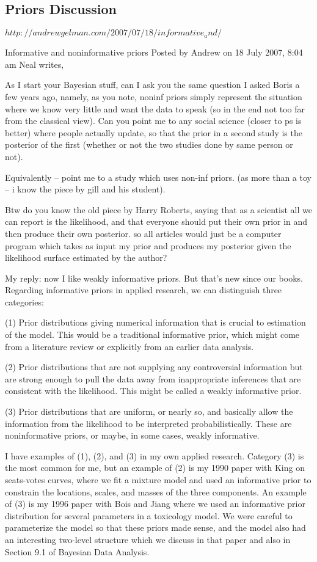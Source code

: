\subsection{Priors Discussion}

$http://andrewgelman.com/2007/07/18/informative_and/$

Informative and noninformative priors
Posted by Andrew on	18 July 2007, 8:04 am
Neal writes,

As I start your Bayesian stuff, can I ask you the same question I asked Boris a few years ago, namely, as you note, noninf priors simply represent the situation where we know very little and want the data to speak (so in the end not too far from the classical view). Can you point me to any social science (closer to ps is better) where people actually update, so that the prior in a second study is the posterior of the first (whether or not the two studies done by same person or not).

Equivalently – point me to a study which uses non-inf priors. (as more than a toy – i know the piece by gill and his student).

Btw do you know the old piece by Harry Roberts, saying that as a scientist all we can report is the likelihood, and that everyone should put their own prior in and then produce their own posterior. so all articles would just be a computer program which takes as input my prior and produces my posterior given the likelihood surface estimated by the author?

My reply: now I like weakly informative priors. But that’s new since our books. Regarding informative priors in applied research, we can distinguish three categories:

(1) Prior distributions giving numerical information that is crucial to estimation of the model. This would be a traditional informative prior, which might come from a literature review or explicitly from an earlier data analysis.

(2) Prior distributions that are not supplying any controversial information but are strong enough to pull the data away from inappropriate inferences that are consistent with the likelihood. This might be called a weakly informative prior.

(3) Prior distributions that are uniform, or nearly so, and basically allow the information from the likelihood to be interpreted probabilistically. These are noninformative priors, or maybe, in some cases, weakly informative.

I have examples of (1), (2), and (3) in my own applied research. Category (3) is the most common for me, but an example of (2) is my 1990 paper with King on seats-votes curves, where we fit a mixture model and used an informative prior to constrain the locations, scales, and masses of the three components. An example of (3) is my 1996 paper with Bois and Jiang where we used an informative prior distribution for several parameters in a toxicology model. We were careful to parameterize the model so that these priors made sense, and the model also had an interesting two-level structure which we discuss in that paper and also in Section 9.1 of Bayesian Data Analysis.

